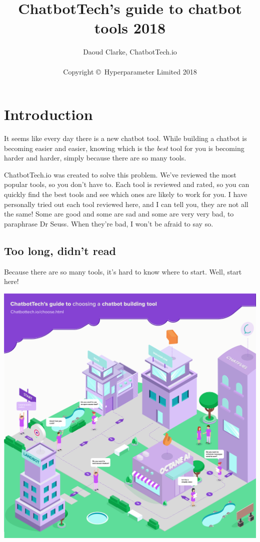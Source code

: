 \documentclass[ebook,article,11pt]{memoir}
\author{Daoud Clarke, ChatbotTech.io\\
  \\
  Copyright \copyright\ Hyperparameter Limited 2018}
\title{ChatbotTech's guide to chatbot tools 2018}
\date{}
\begin{document}
\maketitle

\chapter{Introduction}

It seems like every day there is a new chatbot tool. While building a
chatbot is becoming easier and easier, knowing which is the
\emph{best} tool for you is becoming harder and harder, simply because
there are so many tools.

ChatbotTech.io was created to solve this problem. We've reviewed the
most popular tools, so you don't have to. Each tool is reviewed and
rated, so you can quickly find the best tools and see which ones are
likely to work for you. I have personally tried out each tool reviewed
here, and I can tell you, they are not all the same! Some are good and
some are sad and some are very very bad, to paraphrase Dr Seuss. When
they're bad, I won't be afraid to say so.

\section*{Too long, didn't read}

Because there are so many tools, it's hard to know where to
start. Well, start here!

\begin{center}
\includegraphics[width=\textwidth]{guide.png}
\end{center}
\end{document}
